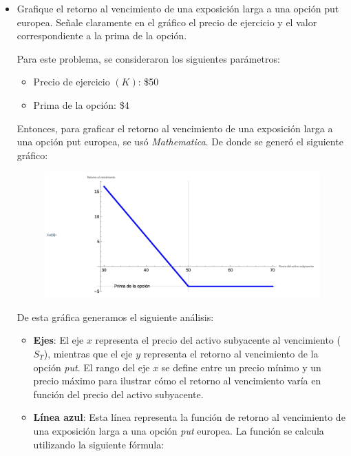 \begin{problema}[Problema D]
\begin{itemize}
\begin{sol}
    
        \end{sol}
        
        \item Grafique el retorno al vencimiento de una exposición larga a una opción put europea.
        Señale claramente en el gráfico el precio de ejercicio y el valor correspondiente a la prima de la opción.
        \begin{sol}
            Para este problema, se consideraron los siguientes parámetros: 
            \begin{itemize}
                \item Precio de ejercicio $(K)$: \$50
                \item Prima de la opción: \$4 
            \end{itemize}
            Entonces, para graficar el retorno al vencimiento de una exposición larga a una opción put europea, se usó \textit{Mathematica}. De donde se generó el siguiente gráfico: 
            \begin{figure}[H]
                \centering
                \includegraphics[scale=0.5]{imagenes/1.png}
            \end{figure}
            De esta gráfica generamos el siguiente análisis: 
            \begin{itemize}
                \item \textbf{Ejes}: El eje $x$ representa el precio del activo subyacente al vencimiento ($S_T$), mientras que el eje $y$ representa el retorno al vencimiento de la opción \textit{put}. El rango del eje $x$ se define entre un precio mínimo y un precio máximo para ilustrar cómo el retorno al vencimiento varía en función del precio del activo subyacente.
                \item \textbf{Línea azul}: Esta línea representa la función de retorno al vencimiento de una exposición larga a una opción \textit{put} europea. La función se calcula utilizando la siguiente fórmula:

\end{itemize}
\end{sol}
\end{itemize}
\end{problema}
